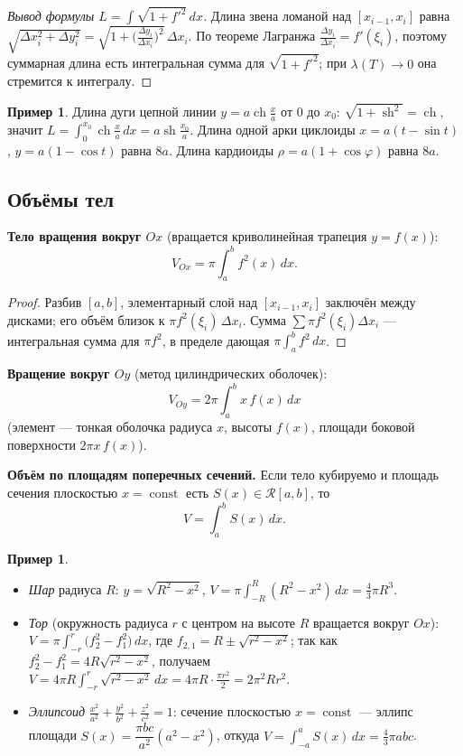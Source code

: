 \documentclass[11pt,a4paper]{article}
\theoremstyle{definition}
\newtheorem{example}[definition]{Пример}
\theoremstyle{plain}
\DeclareMathOperator{\sh}{sh}
\DeclareMathOperator{\ch}{ch}
\DeclareMathOperator{\Const}{const}
\newcommand{\dx}{\,dx}
\begin{document}
\begin{proof}[Вывод формулы $L=\int\sqrt{1+f'^2}\,dx$]
Длина звена ломаной над $[x_{i-1},x_i]$ равна
$\sqrt{\Delta x_i^2+\Delta y_i^2}=\sqrt{1+\bigl(\tfrac{\Delta y_i}{\Delta x_i}\bigr)^2}\,\Delta x_i$.
По теореме Лагранжа $\tfrac{\Delta y_i}{\Delta x_i}=f'(\xi_i)$, поэтому суммарная длина есть
интегральная сумма для $\sqrt{1+f'^2}$; при $\lambda(T)\to0$ она стремится к интегралу.
\end{proof}

\begin{example}
Длина дуги цепной линии $y=a\ch\frac xa$ от $0$ до $x_0$:
$\sqrt{1+\sh^2}=\ch$, значит $L=\int_0^{x_0}\ch\frac xa\dx=a\sh\frac{x_0}a$. Длина одной арки
циклоиды $x=a(t-\sin t)$, $y=a(1-\cos t)$ равна $8a$. Длина кардиоиды $\rho=a(1+\cos\varphi)$
равна $8a$.
\end{example}

\subsection{Объёмы тел}

\textbf{Тело вращения вокруг $Ox$} (вращается криволинейная трапеция $y=f(x)$):
\[
  V_{Ox}=\pi\int_a^b f^2(x)\dx .
\]

\begin{proof}
Разбив $[a,b]$, элементарный слой над $[x_{i-1},x_i]$ заключён между дисками; его объём близок к
$\pi f^2(\xi_i)\,\Delta x_i$. Сумма $\sum\pi f^2(\xi_i)\Delta x_i$ — интегральная сумма для
$\pi f^2$, в пределе дающая $\pi\int_a^b f^2\dx$.
\end{proof}

\textbf{Вращение вокруг $Oy$} (метод цилиндрических оболочек):
\[
  V_{Oy}=2\pi\int_a^b x\,f(x)\dx
\]
(элемент — тонкая оболочка радиуса $x$, высоты $f(x)$, площади боковой поверхности
$2\pi x\,f(x)$).

\textbf{Объём по площадям поперечных сечений.} Если тело кубируемо и площадь сечения плоскостью
$x=\Const$ есть $S(x)\in\mathcal R[a,b]$, то
\[
  V=\int_a^b S(x)\dx .
\]

\begin{example}\leavevmode
\begin{itemize}[leftmargin=*]
  \item \emph{Шар} радиуса $R$: $y=\sqrt{R^2-x^2}$, $\displaystyle V=\pi\int_{-R}^{R}(R^2-x^2)\dx
        =\frac43\pi R^3$.
  \item \emph{Тор} (окружность радиуса $r$ с центром на высоте $R$ вращается вокруг $Ox$):
        $V=\pi\int_{-r}^{r}\bigl(f_2^2-f_1^2\bigr)\dx$, где $f_{2,1}=R\pm\sqrt{r^2-x^2}$; так как
        $f_2^2-f_1^2=4R\sqrt{r^2-x^2}$, получаем $V=4\pi R\int_{-r}^{r}\sqrt{r^2-x^2}\dx
        =4\pi R\cdot\frac{\pi r^2}{2}=2\pi^2 R r^2$.
  \item \emph{Эллипсоид} $\frac{x^2}{a^2}+\frac{y^2}{b^2}+\frac{z^2}{c^2}=1$: сечение плоскостью
        $x=\Const$ — эллипс площади $S(x)=\dfrac{\pi bc}{a^2}(a^2-x^2)$, откуда
        $\displaystyle V=\int_{-a}^{a}S(x)\dx=\frac43\pi abc$.
\end{itemize}
\end{example}
\end{document}
